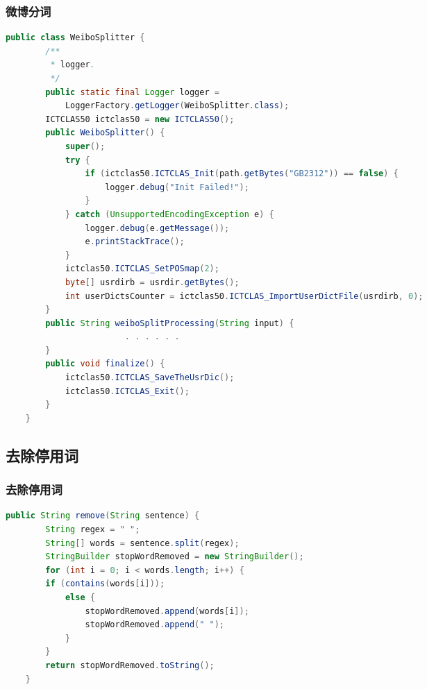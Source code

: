 \documentclass[CJKutf8, table]{beamer}
\begin{document}
\begin{CJK}{UTF8}{gbsn}
\begin{frame}[fragile]
  \frametitle{微博分词}
  \lstset{language=Java,basicstyle=\ttfamily,commentstyle=\ttfamily}
  \begin{tiny}
    \begin{block}{}
      \begin{lstlisting}[language=Java]
    public class WeiboSplitter {
	    /**
	     * logger.
	     */
	    public static final Logger logger = 
            LoggerFactory.getLogger(WeiboSplitter.class);
        ICTCLAS50 ictclas50 = new ICTCLAS50();
        public WeiboSplitter() {
            super();
            try {
                if (ictclas50.ICTCLAS_Init(path.getBytes("GB2312")) == false) {
                    logger.debug("Init Failed!");
                }
            } catch (UnsupportedEncodingException e) {
                logger.debug(e.getMessage());
                e.printStackTrace();
            }
            ictclas50.ICTCLAS_SetPOSmap(2);
            byte[] usrdirb = usrdir.getBytes();
            int userDictsCounter = ictclas50.ICTCLAS_ImportUserDictFile(usrdirb, 0);
        }
        public String weiboSplitProcessing(String input) {
                        . . . . . .
        }
        public void finalize() {
            ictclas50.ICTCLAS_SaveTheUsrDic();
            ictclas50.ICTCLAS_Exit();
        }
    }
      \end{lstlisting}
    \end{block}
  \end{tiny}
\end{frame}

\subsection{去除停用词}
\begin{frame}[fragile]
  \frametitle{去除停用词}
  \lstset{language=Java,basicstyle=\ttfamily,commentstyle=\ttfamily}
  \begin{tiny}
    \begin{block}{}
      \begin{lstlisting}[language=Java]
    public String remove(String sentence) {
        String regex = " ";
        String[] words = sentence.split(regex);
        StringBuilder stopWordRemoved = new StringBuilder();
        for (int i = 0; i < words.length; i++) {
        if (contains(words[i]));
            else {
                stopWordRemoved.append(words[i]);
                stopWordRemoved.append(" ");
            }
        }
        return stopWordRemoved.toString();
    }
      \end{lstlisting}
    \end{block}
  \end{tiny}
\end{frame}


\end{CJK}
\end{document}
